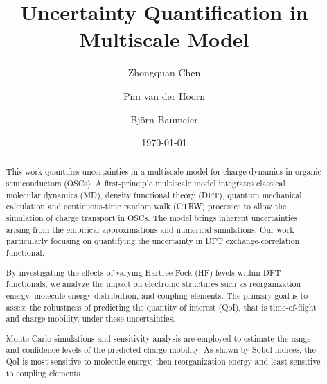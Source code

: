 \documentclass[%
 reprint,
superscriptaddress,
 amsmath,amssymb,
 aps,
prb,
floatfix
]{revtex4-2}
\begin{document}
\title{Uncertainty Quantification in Multiscale Model}

\author{Zhongquan Chen}
\author{Pim van der Hoorn}
\author{Bj\"orn Baumeier}



\date{\today}%

\begin{abstract}
  This work quantifies uncertainties in a multiscale model for charge dynamics in organic semiconductors (OSCs). A first-principle multiscale model integrates classical molecular dynamics (MD), density functional theory (DFT), quantum mechanical calculation and continuous-time random walk (CTRW) processes to allow the simulation of charge transport in OSCs. The model brings inherent uncertainties arising from the empirical approximations and numerical simulations. Our work particularly focusing on quantifying the uncertainty in DFT exchange-correlation functional.

  By investigating the effects of varying Hartree-Fock (HF) levels within DFT functionals, we analyze the impact on electronic structures such as reorganization energy, molecule energy distribution, and coupling elements. The primary goal is to assess the robustness of predicting the quantity of interest (QoI), that is time-of-flight and charge mobility, under these uncertainties.
  
  Monte Carlo simulations and sensitivity analysis are employed to estimate the range and confidence levels of the predicted charge mobility. As shown by Sobol indices, the QoI is most sensitive to molecule energy, then reorganization energy and least sensitive to coupling elements.  
\end{abstract}

\maketitle

\end{document}
